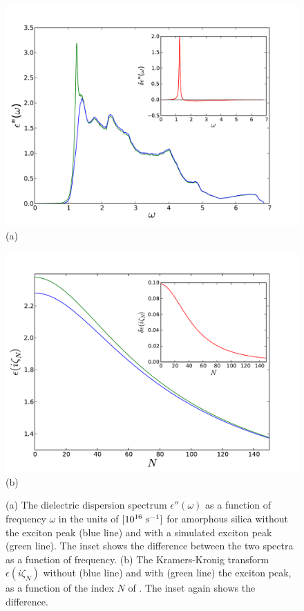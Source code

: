 \documentclass[letterpaper,twocolumn,amsmath,amssymb,floatfix,aps,superscriptaddress]{revtex4}
\begin{document}
\begin{figure}[t!]
\begin{center}
\begin{minipage}[b]{0.45\textwidth}
\begin{center}
\includegraphics[width=1.2\textwidth]{./130807_plots/fig2a_eps2_deps2.pdf} (a)
\end{center}
\end{minipage}
\hskip 34pt
\begin{minipage}[b]{0.45\textwidth}
\begin{center}
\includegraphics[width=1.2\textwidth]{./130807_plots/fig2b_eiz_deiz.pdf} (b)
\end{center}
\end{minipage}
\caption{(a) The dielectric dispersion spectrum $\epsilon''(\omega)$ as a  function of frequency $\omega$ in the units of $\rm [10^{16} ~s^{-1}]$ for amorphous silica without the exciton peak (blue line) and with a simulated exciton peak (green line). The inset shows the difference between the two spectra as a function of frequency. (b) The Kramers-Kronig transform $\epsilon(i \zeta_N)$ without (blue line) and with (green line) the exciton peak, as a function of the index $N$ of . The inset again shows the difference.}
\label{fiddle2}
\end{center}
\end{figure} 
\end{document}
